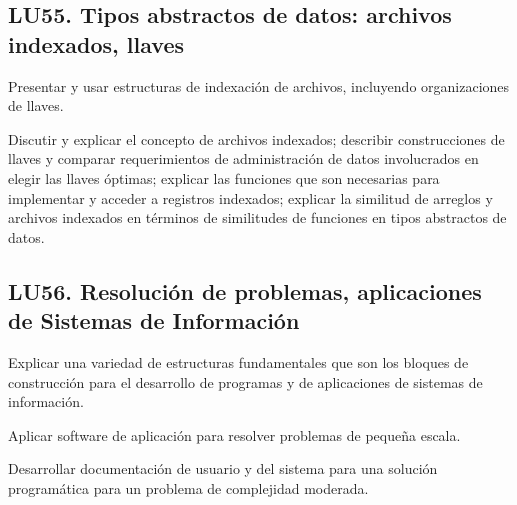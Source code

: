 \subsection{LU55. Tipos abstractos de datos: archivos indexados, llaves}\label{sec:LU55}
\begin{LearningUnit}
\begin{LUGoal}
\item Presentar y usar estructuras de indexación de archivos, incluyendo organizaciones de llaves.
\end{LUGoal}

\begin{LUObjective}
\item Discutir y explicar el concepto de archivos indexados; describir construcciones de llaves y comparar requerimientos de administración de datos involucrados en elegir las llaves óptimas; explicar las funciones que son necesarias para implementar y acceder a registros indexados; explicar la similitud de arreglos y archivos indexados en términos de similitudes de funciones en tipos abstractos de datos.
\end{LUObjective}
\end{LearningUnit}

\subsection{LU56. Resolución de problemas, aplicaciones de Sistemas de Información}\label{sec:LU56}
\begin{LearningUnit}
\begin{LUGoal}
\item Explicar una variedad de estructuras fundamentales que son los bloques de construcción para el desarrollo de programas y de aplicaciones de sistemas de información.
\end{LUGoal}

\begin{LUObjective}
\item Aplicar software de aplicación para resolver problemas de pequeña escala.
\item Desarrollar documentación de usuario y del sistema para una solución programática para un problema de complejidad moderada.
\end{LUObjective}
\end{LearningUnit}

